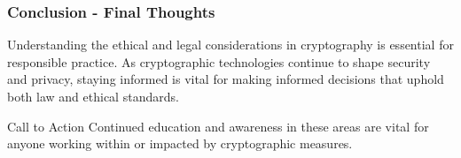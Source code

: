 \documentclass{beamer}
\begin{document}
\begin{frame}[fragile]
    \frametitle{Conclusion - Final Thoughts}
    Understanding the ethical and legal considerations in cryptography is essential for responsible practice. As cryptographic technologies continue to shape security and privacy, staying informed is vital for making informed decisions that uphold both law and ethical standards. 

    \begin{block}{Call to Action}
        Continued education and awareness in these areas are vital for anyone working within or impacted by cryptographic measures.
    \end{block}
\end{frame}
\end{document}
